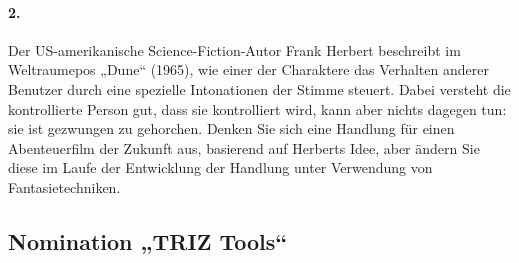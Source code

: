 \documentclass[11pt,a4paper]{article}
\begin{document}
\paragraph{2.}
Der US-amerikanische Science-Fiction-Autor Frank Herbert beschreibt im
Weltraumepos „Dune“ (1965), wie einer der Charaktere das Verhalten anderer
Benutzer durch eine spezielle Intonationen der Stimme steuert. Dabei versteht
die kontrollierte Person gut, dass sie kontrolliert wird, kann aber nichts
dagegen tun: sie ist gezwungen zu gehorchen. Denken Sie sich eine Handlung für
einen Abenteuerfilm der Zukunft aus, basierend auf Herberts Idee, aber ändern
Sie diese im Laufe der Entwicklung der Handlung unter Verwendung von
Fantasietechniken.

\subsection*{Nomination „TRIZ Tools“}
\end{document}
